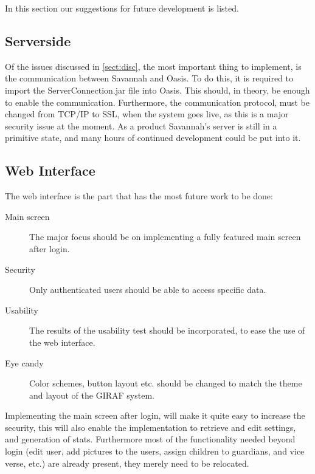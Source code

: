 In this section our suggestions for future development is listed.

\subsection*{Serverside}
Of the issues discussed in \autoref{sect:disc}, 
the most important thing to implement, is the communication between Savannah and Oasis. To do this, it is required to import the ServerConnection.jar file into Oasis. This should, in theory, be enough to enable the communication. Furthermore, the communication protocol, must be changed from TCP/IP to SSL, when the system goes live, as this is a major security issue at the moment.
As a product Savannah's server is still in a primitive state, and many hours of continued development could be put into it.


\subsection*{Web Interface}
The web interface is the part that has the most future work to be done:
\begin{description}
	\item[Main screen] The major focus should be on implementing a fully featured main screen after login.
	\item[Security] Only authenticated users should be able to access specific data.
	\item[Usability] The results of the usability test should be incorporated, to ease the use of the web interface.
	\item[Eye candy] Color schemes, button layout etc. should be changed to match the theme and layout of the GIRAF system.
\end{description}

Implementing the main screen after login, will make it quite easy to increase the security, this will also enable the implementation to retrieve and edit settings, and generation of stats. Furthermore most of the functionality needed beyond login (edit user, add pictures to the users, assign children to guardians, and vice verse, etc.) are already present, they merely need to be relocated.